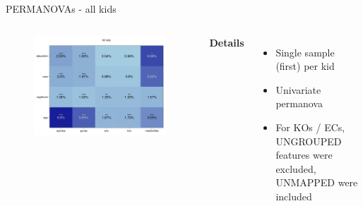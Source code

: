 \begin{frame}{PERMANOVAs - all kids}
    \begin{columns}[c] %

    
        \begin{figure}
        \includegraphics[width=1\linewidth]{../figures/kids_all_permanovas.png}
        \end{figure}

    
        \textbf{Details}
        \begin{itemize}
            \item Single sample (first) per kid
            \item Univariate permanova
            \item For KOs / ECs, UNGROUPED features were excluded, UNMAPPED were included
        \end{itemize}

    \end{columns}

\end{frame} 

